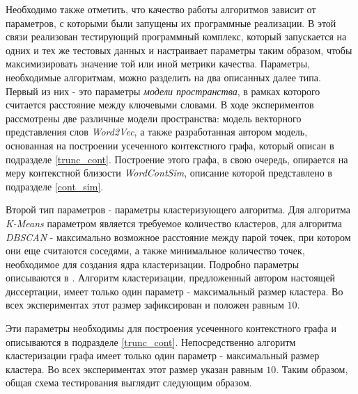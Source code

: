 Необходимо также отметить, что качество работы алгоритмов зависит от параметров, с которыми были запущены их программные реализации. В этой связи реализован тестирующий программный комплекс, который запускается на одних и тех же тестовых данных и настраивает параметры таким образом, чтобы максимизировать значение той или иной метрики качества. Параметры, необходимые алгоритмам, можно разделить на два описанных далее типа. Первый из них - это параметры \emph{модели пространства}, в рамках которого считается расстояние между ключевыми словами. В ходе экспериментов рассмотрены две различные модели пространства: модель векторного представления слов \emph{Word2Vec}, а также разработанная автором модель, основанная на построении усеченного контекстного графа, который описан в подразделе \ref{trunc_cont}. Построение этого графа, в свою очередь, опирается на меру контекстной близости \emph{WordContSim}, описание которой представлено в подразделе \ref{cont_sim}.

Второй тип параметров - параметры кластеризующего алгоритма. Для алгоритма \emph{K-Means} параметром является требуемое количество кластеров, для алгоритма \emph{DBSCAN} - максимально возможное расстояние между парой точек, при котором они еще считаются соседями, а также минимальное количество точек, необходимое для создания ядра кластеризации. Подробно параметры описываются в \cite{dbscan}. Алгоритм кластеризации, предложенный автором настоящей диссертации, имеет только один параметр - максимальный размер кластера. Во всех экспериментах этот размер зафиксирован и положен равным $10$.

Эти параметры необходимы для построения усеченного контекстного графа и описываются в подразделе \ref{trunc_cont}. Непосредственно алгоритм кластеризации графа имеет только один параметр - максимальный размер кластера. Во всех экспериментах этот размер указан равным $10$. Таким образом, общая схема тестирования выглядит следующим образом.


